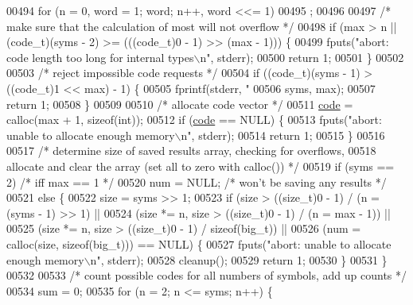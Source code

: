 \begin{DoxyCode}
{{{{00494     \textcolor{keywordflow}{for} (n = 0, word = 1; word; n++, word <<= 1)
00495         ;
00496 
00497     \textcolor{comment}{/* make sure that the calculation of most will not overflow */}
00498     \textcolor{keywordflow}{if} (max > n || (code\_t)(syms - 2) >= (((code\_t)0 - 1) >> (max - 1))) \{
00499         fputs(\textcolor{stringliteral}{"abort: code length too long for internal types\(\backslash\)n"}, stderr);
00500         \textcolor{keywordflow}{return} 1;
00501     \}
00502 
00503     \textcolor{comment}{/* reject impossible code requests */}
00504     \textcolor{keywordflow}{if} ((code\_t)(syms - 1) > ((code\_t)1 << max) - 1) \{
00505         fprintf(stderr, \textcolor{stringliteral}{"%
00506                 syms, max);
00507         \textcolor{keywordflow}{return} 1;
00508     \}
00509 
00510     \textcolor{comment}{/* allocate code vector */}
00511     \hyperlink{structcode}{code} = calloc(max + 1, \textcolor{keyword}{sizeof}(\textcolor{keywordtype}{int}));
00512     \textcolor{keywordflow}{if} (\hyperlink{structcode}{code} == NULL) \{
00513         fputs(\textcolor{stringliteral}{"abort: unable to allocate enough memory\(\backslash\)n"}, stderr);
00514         \textcolor{keywordflow}{return} 1;
00515     \}
00516 
00517     \textcolor{comment}{/* determine size of saved results array, checking for overflows,}
00518 \textcolor{comment}{       allocate and clear the array (set all to zero with calloc()) */}
00519     \textcolor{keywordflow}{if} (syms == 2)              \textcolor{comment}{/* iff max == 1 */}
00520         num = NULL;             \textcolor{comment}{/* won't be saving any results */}
00521     \textcolor{keywordflow}{else} \{
00522         size = syms >> 1;
00523         \textcolor{keywordflow}{if} (size > ((\textcolor{keywordtype}{size\_t})0 - 1) / (n = (syms - 1) >> 1) ||
00524                 (size *= n, size > ((\textcolor{keywordtype}{size\_t})0 - 1) / (n = max - 1)) ||
00525                 (size *= n, size > ((\textcolor{keywordtype}{size\_t})0 - 1) / \textcolor{keyword}{sizeof}(big\_t)) ||
00526                 (num = calloc(size, \textcolor{keyword}{sizeof}(big\_t))) == NULL) \{
00527             fputs(\textcolor{stringliteral}{"abort: unable to allocate enough memory\(\backslash\)n"}, stderr);
00528             cleanup();
00529             \textcolor{keywordflow}{return} 1;
00530         \}
00531     \}
00532 
00533     \textcolor{comment}{/* count possible codes for all numbers of symbols, add up counts */}
00534     sum = 0;
00535     \textcolor{keywordflow}{for} (n = 2; n <= syms; n++) \{
}}}}}
\end{DoxyCode}
